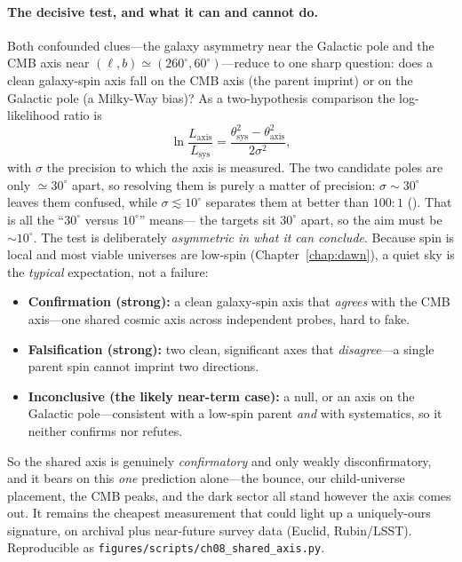 \paragraph{The decisive test, and what it can and cannot do.} Both confounded
clues---the galaxy asymmetry near the Galactic pole and the CMB axis near
$(\ell,b)\simeq(260^\circ,60^\circ)$---reduce to one sharp question: does a clean
galaxy-spin axis fall on the CMB axis (the parent imprint) or on the Galactic pole
(a Milky-Way bias)? As a two-hypothesis comparison the log-likelihood ratio is
\begin{equation}
  \ln\frac{L_{\mathrm{axis}}}{L_{\mathrm{sys}}}
  = \frac{\theta_{\mathrm{sys}}^2-\theta_{\mathrm{axis}}^2}{2\sigma^2},
  \label{eq:axis-llr}
\end{equation}
with $\sigma$ the precision to which the axis is measured. The two candidate poles
are only $\simeq30^\circ$ apart, so resolving them is purely a matter of
precision: $\sigma\sim30^\circ$ leaves them confused, while
$\sigma\lesssim10^\circ$ separates them at better than $100\!:\!1$
(). That is all the ``$30^\circ$ versus $10^\circ$'' means---
the targets sit $30^\circ$ apart, so the aim must be $\sim\!10^\circ$. The test is
deliberately \emph{asymmetric in what it can conclude}. Because spin is local and
most viable universes are low-spin (Chapter~\ref{chap:dawn}), a quiet sky is the
\emph{typical} expectation, not a failure:
\begin{itemize}
  \item \textbf{Confirmation (strong):} a clean galaxy-spin axis that \emph{agrees}
    with the CMB axis---one shared cosmic axis across independent probes, hard to
    fake.
  \item \textbf{Falsification (strong):} two clean, significant axes that
    \emph{disagree}---a single parent spin cannot imprint two directions.
  \item \textbf{Inconclusive (the likely near-term case):} a null, or an axis on
    the Galactic pole---consistent with a low-spin parent \emph{and} with
    systematics, so it neither confirms nor refutes.
\end{itemize}
So the shared axis is genuinely \emph{confirmatory} and only weakly
disconfirmatory, and it bears on this \emph{one} prediction alone---the bounce, our
child-universe placement, the CMB peaks, and the dark sector all stand however the
axis comes out. It remains the cheapest measurement that could light up a
uniquely-ours signature, on archival plus near-future survey data (Euclid,
Rubin/LSST). Reproducible as \texttt{figures/scripts/ch08\_shared\_axis.py}.

